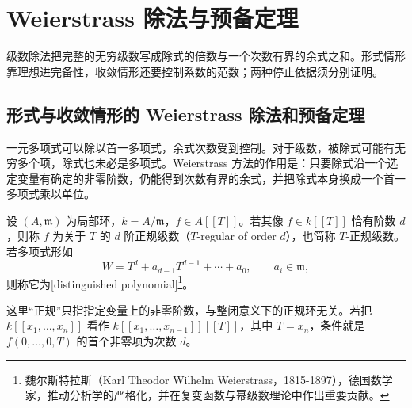 
\section{Weierstrass 除法与预备定理}
\label{b3:sec:D03}

级数除法把完整的无穷级数写成除式的倍数与一个次数有界的余式之和。形式情形靠理想进完备性，收敛情形还要控制系数的范数；两种停止依据须分别证明。

%
%
%


\subsection{形式与收敛情形的 Weierstrass 除法和预备定理}
\label{b3:subsec:D03:01}

一元多项式可以除以首一多项式，余式次数受到控制。对于级数，被除式可能有无穷多个项，除式也未必是多项式。Weierstrass 方法的作用是：只要除式沿一个选定变量有确定的非零阶数，仍能得到次数有界的余式，并把除式本身换成一个首一多项式乘以单位。

\begin{definition}\label{b3:def:distinguished-series}
	设 \((A,\mathfrak m)\) 为局部环，\(k=A/\mathfrak m\)，\(f\in A[\![T]\!]\)。若其像 \(\overline f\in k[\![T]\!]\) 恰有阶数 \(d\)，则称 \(f\) 为关于 \(T\) 的 \(d\) 阶正规级数（\(T\)-regular of order \(d\)），也简称 \(T\)-正规级数。若多项式形如
	\[
		W=T^d+a_{d-1}T^{d-1}+\cdots+a_0,\qquad a_i\in\mathfrak m,
	\]
	则称它为[distinguished polynomial]\footnote{魏尔斯特拉斯（Karl Theodor Wilhelm Weierstrass，1815-1897），德国数学家，推动分析学的严格化，并在复变函数与幂级数理论中作出重要贡献。}。
\end{definition}

这里“正规”只指指定变量上的非零阶数，与整闭意义下的正规环无关。若把 \(k[\![x_1,\ldots,x_n]\!]\) 看作 \(k[\![x_1,\ldots,x_{n-1}]\!][\![T]\!]\)，其中 \(T=x_n\)，条件就是 \(f(0,\ldots,0,T)\) 的首个非零项为次数 \(d\)。

